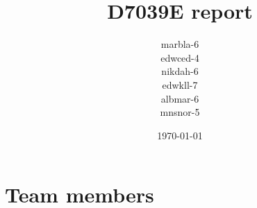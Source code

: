 \documentclass{report}
\title{D7039E report}
\author{marbla-6 \\
        edwced-4 \\
        nikdah-6 \\
        edwkll-7 \\
        albmar-6 \\
        mnsnor-5 \\
        }
\date{\today}
\begin{document}
\maketitle
\appendix
\chapter{Team members}

\end{document}
